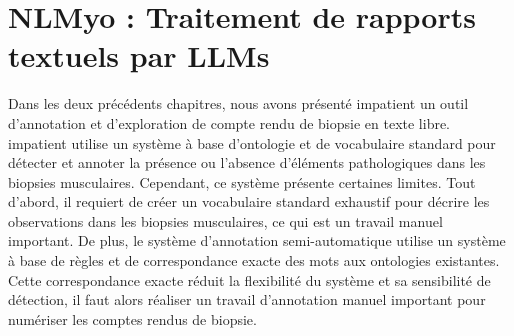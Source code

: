 \chapter{NLMyo : Traitement de rapports textuels par LLMs}

Dans les deux précédents chapitres, nous avons présenté \gls{impatient} un outil d'annotation et d'exploration de compte rendu de biopsie en texte libre. \gls{impatient} utilise un système à base d'ontologie et de vocabulaire standard pour détecter et annoter la présence ou l'absence d'éléments pathologiques dans les biopsies musculaires. Cependant, ce système présente certaines limites. Tout d'abord, il requiert de créer un vocabulaire standard exhaustif pour décrire les observations dans les biopsies musculaires, ce qui est un travail manuel important. De plus, le système d'annotation semi-automatique utilise un système à base de règles et de correspondance exacte des mots aux ontologies existantes. Cette correspondance exacte réduit la flexibilité du système et sa sensibilité de détection, il faut alors réaliser un travail d'annotation manuel important pour numériser les comptes rendus de biopsie. 

